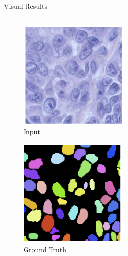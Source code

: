 \documentclass{beamer}
\begin{document}
\begin{frame}{Visual Results}

\begin{columns}
\begin{column}{0.3\textwidth}
\begin{figure}
\includegraphics[width = 0.8\linewidth]{RAW} 
\caption{Input}
\end{figure}

\begin{figure}
\includegraphics[width = 0.8\linewidth]{LBL} 
\caption{Ground Truth}
\end{figure}


\end{column}
\end{columns}
\end{frame}
\end{document}
